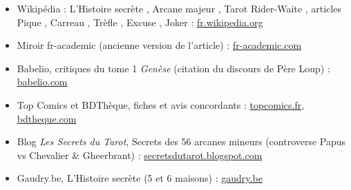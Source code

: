 \documentclass[11pt,a5paper]{article}
\begin{document}
\begin{itemize}
\item Wikipédia : \og L'Histoire secrète \fg{}, \og Arcane majeur \fg{},
\og Tarot Rider-Waite \fg{}, articles \og Pique \fg{}, \og Carreau \fg{},
\og Trèfle \fg{}, \og Excuse \fg{}, \og Joker \fg{} :
\href{https://fr.wikipedia.org/wiki/L'Histoire_secr%C3%A8te}{fr.wikipedia.org}
\item Miroir fr-academic (ancienne version de l'article) :
\href{https://fr-academic.com/dic.nsf/frwiki/932400}{fr-academic.com}
\item Babelio, critiques du tome 1 \emph{Genèse} (citation du discours de Père Loup) :
\href{https://www.babelio.com/livres/Pecau-LHistoire-Secrete-Tome-1--Genese/48758}{babelio.com}
\item Top Comics et BDThèque, fiches et avis concordants :
\href{https://topcomics.fr/l-histoire-secrete-jean-pierre-pecau-revisite-3-000-ans-d-histoire-avis-critique}{topcomics.fr},
\href{https://www.bdtheque.com/series/4490/l-histoire-secrete}{bdtheque.com}
\item Blog \emph{Les Secrets du Tarot}, \og Secrets des 56 arcanes mineurs \fg{}
(controverse Papus vs Chevalier \& Gheerbrant) :
\href{http://secretsdutarot.blogspot.com/2012/11/secrets-des-56-arcanes-mineurs.html}{secretsdutarot.blogspot.com}
\item Gaudry.be, \og L'Histoire secrète \fg{} (5\ieme{} et 6\ieme{} maisons) :
\href{https://www.gaudry.be/bd/l-histoire-secrete/}{gaudry.be}
\end{itemize}
\end{document}
